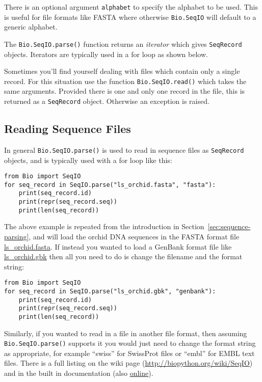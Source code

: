 \noindent There is an optional argument \verb|alphabet| to specify the alphabet to be used.  This is useful for file formats like FASTA where otherwise \verb|Bio.SeqIO| will default to a generic alphabet.

The \verb|Bio.SeqIO.parse()| function returns an \textit{iterator} which gives \verb|SeqRecord| objects.  Iterators are typically used in a for loop as shown below.

Sometimes you'll find yourself dealing with files which contain only a single record.  For this situation use the function \verb|Bio.SeqIO.read()| which takes the same arguments.  Provided there is one and only one record in the file, this is returned as a \verb|SeqRecord| object.  Otherwise an exception is raised.

\subsection{Reading Sequence Files}

In general \verb|Bio.SeqIO.parse()| is used to read in sequence files as \verb|SeqRecord| objects, and is typically used with a for loop like this:

\begin{verbatim}
from Bio import SeqIO
for seq_record in SeqIO.parse("ls_orchid.fasta", "fasta"):
    print(seq_record.id)
    print(repr(seq_record.seq))
    print(len(seq_record))
\end{verbatim}

The above example is repeated from the introduction in Section~\ref{sec:sequence-parsing}, and will load the orchid DNA sequences in the FASTA format file \href{https://raw.githubusercontent.com/biopython/biopython/master/Doc/examples/ls_orchid.fasta}{ls\_orchid.fasta}.  If instead you wanted to load a GenBank format file like \href{https://raw.githubusercontent.com/biopython/biopython/master/Doc/examples/ls_orchid.gbk}{ls\_orchid.gbk} then all you need to do is change the filename and the format string:

\begin{verbatim}
from Bio import SeqIO
for seq_record in SeqIO.parse("ls_orchid.gbk", "genbank"):
    print(seq_record.id)
    print(repr(seq_record.seq))
    print(len(seq_record))
\end{verbatim}

Similarly, if you wanted to read in a file in another file format, then assuming \verb|Bio.SeqIO.parse()| supports it you would just need to change the format string as appropriate, for example ``swiss'' for SwissProt files or ``embl'' for EMBL text files. There is a full listing on the wiki page (\url{http://biopython.org/wiki/SeqIO}) and in the built in documentation (also \href{http://biopython.org/DIST/docs/api/Bio.SeqIO-module.html}{online}).


